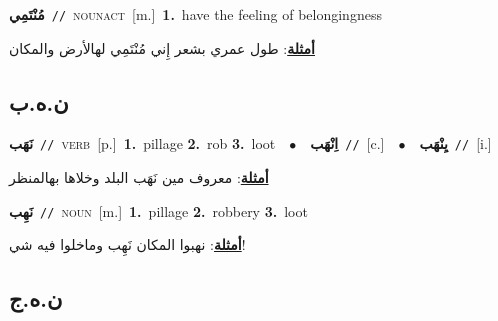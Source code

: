 \documentclass[10pt,a4paper,twoside]{article} %
\begin{document}
\begin{multicols}{2}
{\setlength\topsep{0pt}\textbf{\foreignlanguage{arabic}{مُنْتَمِي}}\ {\color{gray}\texttt{//}\color{black}}\ \textsc{noun\textunderscore act}\ [m.]\ \textbf{1.}~have the feeling of belongingness\  \begin{flushright}\color{gray}\foreignlanguage{arabic}{\textbf{\underline{\foreignlanguage{arabic}{أمثلة}}}: طول عمري بشعر إِني مُنْتَمِي لهالأرض والمكان}\end{flushright}\color{black}} \vspace{2mm}

\vspace{-3mm}
\subsection*{\color{blue}\foreignlanguage{arabic}{ن.ه.ب}\color{blue}{}} 

{\setlength\topsep{0pt}\textbf{\foreignlanguage{arabic}{نَهَب}}\ {\color{gray}\texttt{//}\color{black}}\ \textsc{verb}\ [p.]\ \textbf{1.}~pillage  \textbf{2.}~rob  \textbf{3.}~loot\ \ $\bullet$\ \ \setlength\topsep{0pt}\textbf{\foreignlanguage{arabic}{اِنْهَب}}\ {\color{gray}\texttt{//}\color{black}}\ [c.]\ \ $\bullet$\ \ \setlength\topsep{0pt}\textbf{\foreignlanguage{arabic}{يِنْهَب}}\ {\color{gray}\texttt{//}\color{black}}\ [i.]\  \begin{flushright}\color{gray}\foreignlanguage{arabic}{\textbf{\underline{\foreignlanguage{arabic}{أمثلة}}}: معروف مين نَهَب البلد وخلاها بهالمنظر}\end{flushright}\color{black}} \vspace{2mm}

{\setlength\topsep{0pt}\textbf{\foreignlanguage{arabic}{نَهِب}}\ {\color{gray}\texttt{//}\color{black}}\ \textsc{noun}\ [m.]\ \textbf{1.}~pillage  \textbf{2.}~robbery  \textbf{3.}~loot\  \begin{flushright}\color{gray}\foreignlanguage{arabic}{\textbf{\underline{\foreignlanguage{arabic}{أمثلة}}}: نهبوا المكان نَهِب وماخلوا فيه شي!}\end{flushright}\color{black}} \vspace{2mm}

\vspace{-3mm}
\subsection*{\color{blue}\foreignlanguage{arabic}{ن.ه.ج}\color{blue}{}} 


\end{multicols}
\end{document}
